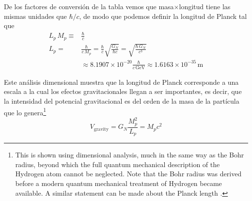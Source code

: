 De los factores de conversión de la tabla vemos que masa$\times$longitud tiene las mismas unidades que $\hbar/c$, de modo que podemos definir la longitud de Planck tal que
\begin{align}
  L_p\,M_p\equiv&\frac{\hbar}{c}\nonumber\\
  L_p=&\frac{\hbar}{c\,M_p}=\frac{\hbar}{c}\sqrt{\frac{G_N}{\hbar c}}=\sqrt{\frac{\hbar\, G_N}{c^3}}\nonumber\\
  &\approx8.1907\times10^{-20}\frac{\hbar}{c\,\text{GeV}} \approx1.6163\times10^{-35}\,\text{m}
\end{align}

Este análisis dimensional muestra que la longitud de Planck corresponde a una escala a la cual los efectos gravitacionales llegan a ser importantes, es decir, que la intensidad del potencial gravitacional es del orden de la masa de la partícula que lo genera\footnote{This is shown using dimensional analysis, much in the same
way as the Bohr radius, beyond which the full quantum mechanical
description of the Hydrogen atom cannot be neglected. Note that the
Bohr radius was derived before a modern quantum mechanical treatment
of Hydrogen became available. A similar statement can be made about
the Planck length \cite{andim}.}
\begin{equation}
  \label{eq:241}
  V_{\text{gravity}}=G_N\frac{M_p^2}{L_p}=M_pc^2
\end{equation}


